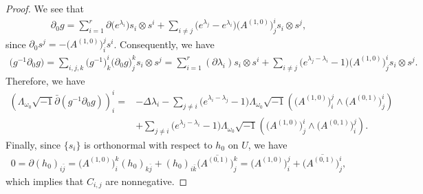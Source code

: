 \documentclass[10pt,a4paper]{amsart}
\begin{document}
\begin{proof}
We see that
\begin{align*}
    \partial_0 g=\sum_{i=1}^r \partial \big(e^{\lambda_i}\big) s_i\otimes s^i + \sum_{i\neq j} \big(e^{\lambda_j}-e^{\lambda_i}\big)\big(A^{(1,0)}\big)^i_j s_i\otimes s^j,
\end{align*}
since $\partial_0 s^j=-\big(A^{(1,0)}\big)^j_i s^i$. Consequently, we have
\begin{align*}
    \big(g^{-1}\partial_0  g\big)=\sum_{i,j,k}\big(g^{-1}\big)^i_k\big(\partial_0g\big)^k_j s_i\otimes s^j=\sum_{i=1}^r (\partial\lambda_i) s_i\otimes s^i+\sum_{i\neq j}\big(e^{\lambda_j-\lambda_i}-1\big)\big(A^{(1,0)}\big)^i_j s_i\otimes s^j.
\end{align*}
Therefore, we have
\begin{equation*}
\begin{aligned}
    \left(\Lambda_{\omega_0}\sqrt{-1}\bar{\partial}(g^{-1}\partial_0g)\right)^i_i
    =&- \Delta\lambda_i
    -\sum_{j\neq i}\big(e^{\lambda_i-\lambda_j}-1\big)\Lambda_{\omega_0}\sqrt{-1}\left(\big(A^{(1,0)}\big)^j_i \wedge\big(A^{(0,1)}\big)^i_j\right)\\
    &+\sum_{j\neq i}\big(e^{\lambda_j-\lambda_i}-1\big)\Lambda_{\omega_0}\sqrt{-1}\left(\big(A^{(1,0)}\big)^i_j \wedge\big(A^{(0,1)}\big)^j_i\right).
\end{aligned}
\end{equation*}
Finally, since $\{s_i\}$ is orthonormal with respect to $h_0$ on $U$, we have
\begin{align*}
    0=\partial (h_0)_{i\bar{j}}=\big(A^{(1,0)}\big)^k_i (h_0)_{k\bar{j}}+(h_0)_{i\bar{k}}\overline{\big(A^{(0,1)}\big)^k_j}=\big(A^{(1,0)}\big)^j_i+\overline{\big(A^{(0,1)}\big)^i_j},
\end{align*}
which implies that $C_{i,j}$ are nonnegative.
\end{proof}
\end{document}
